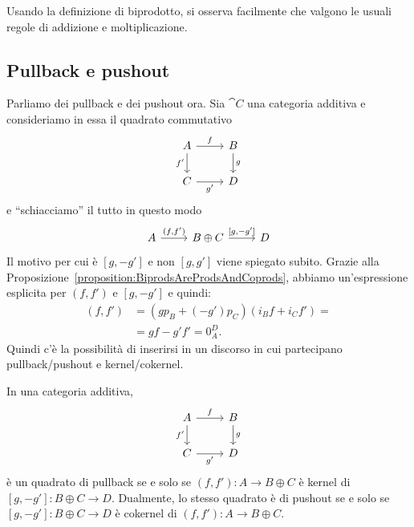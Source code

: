 Usando la definizione di biprodotto, si osserva facilmente che valgono
le usuali regole di addizione e moltiplicazione.



\subsection{Pullback e pushout}

Parliamo dei pullback e dei pushout ora. Sia \(\cat C\) una categoria
additiva e consideriamo in essa il quadrato commutativo
\[
  \begin{tikzcd}
    A \ar["{f}", r] \ar["{f'}", d, swap] & B \ar["{g}", d] \\
    C \ar["{g'}", r, swap] & D
  \end{tikzcd}
\]
e ``schiacciamo'' il tutto in questo modo
\[
  \begin{tikzcd}
    A \ar["{(f, f')}", r] & B \oplus C \ar["{[g, -g']}", r] & D
  \end{tikzcd}
\]
Il motivo per cui è \([g, -g']\) e non \([g, g']\) viene spiegato
subito. Grazie alla
Proposizione~\ref{proposition:BiprodsAreProdsAndCoprods}, abbiamo
un'espressione esplicita per \((f,f')\) e \([g,-g']\) e quindi:
\begin{align*} [g, -g'] (f, f') &= (g p_B + (-g') p_C) (i_B f + i_C f') = \\
                                &= g f - g' f' = 0_A^D .
\end{align*}
Quindi c'è la possibilità di inserirsi in un discorso in cui partecipano
pullback/pushout e kernel/cokernel.

\begin{proposition}\label{proposition:FromPullbackToKernel}
  In una categoria additiva,
  \[
    \begin{tikzcd}
      A \ar["{f}", r] \ar["{f'}", d, swap] & B \ar["{g}", d] \\
      C \ar["{g'}", r, swap] & D
    \end{tikzcd}
  \]
  è un quadrato di pullback se e solo se \((f, f') : A \to B \oplus C\)
  è kernel di \([g, -g'] : B \oplus C \to D\). Dualmente, lo stesso
  quadrato è di pushout se e solo se \([g, -g'] : B \oplus C \to D\) è
  cokernel di \((f, f') : A \to B \oplus C\).
\end{proposition}


